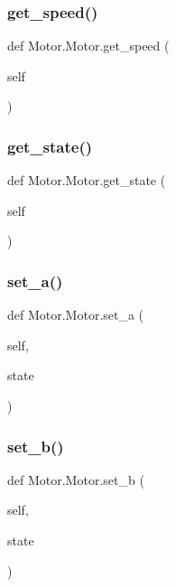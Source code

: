 \subsubsection{\texorpdfstring{get\+\_\+speed()}{get\_speed()}}
{\footnotesize\ttfamily def Motor.\+Motor.\+get\+\_\+speed (\begin{DoxyParamCaption}\item[{}]{self }\end{DoxyParamCaption})}

\mbox{\label{class_motor_1_1_motor_a5aeb33b843755f7e96bc037afdd6794b}} 
\subsubsection{\texorpdfstring{get\+\_\+state()}{get\_state()}}
{\footnotesize\ttfamily def Motor.\+Motor.\+get\+\_\+state (\begin{DoxyParamCaption}\item[{}]{self }\end{DoxyParamCaption})}

\mbox{\label{class_motor_1_1_motor_a5f3b324d2803fdf965e0f4cdd5872ca6}} 
\subsubsection{\texorpdfstring{set\+\_\+a()}{set\_a()}}
{\footnotesize\ttfamily def Motor.\+Motor.\+set\+\_\+a (\begin{DoxyParamCaption}\item[{}]{self,  }\item[{}]{state }\end{DoxyParamCaption})}

\mbox{\label{class_motor_1_1_motor_a6b6473652d46b14568ba27f4b927d715}} 
\subsubsection{\texorpdfstring{set\+\_\+b()}{set\_b()}}
{\footnotesize\ttfamily def Motor.\+Motor.\+set\+\_\+b (\begin{DoxyParamCaption}\item[{}]{self,  }\item[{}]{state }\end{DoxyParamCaption})}

